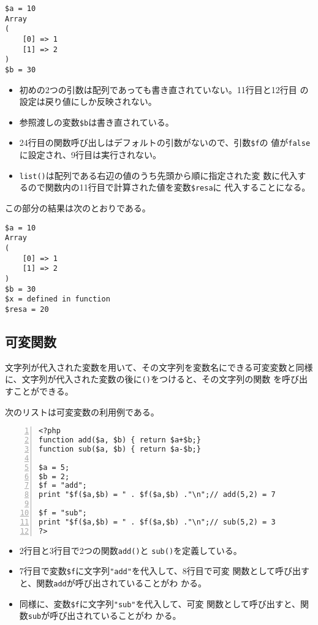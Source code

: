 \begin{Exec}
\begin{Verbatim}
$a = 10
Array
(
    [0] => 1
    [1] => 2
)
$b = 30
\end{Verbatim}
\begin{itemize}
 \item 初めの2つの引数は配列であっても書き直されていない。11行目と12行目
       の設定は戻り値にしか反映されない。
 \item 参照渡しの変数\Verb+$b+は書き直されている。
\end{itemize}
 \iffalse
 \begin{listingcont}
list($resa) = example($a, $as, $b);
print "\$resa = $resa\n";
?>
 \end{listingcont}
 \fi
 \begin{itemize}
 \item 24行目の関数呼び出しはデフォルトの引数がないので、引数\Verb+$f+の
       値が\texttt{false}に設定され、9行目は実行されない。
 \item \texttt{list()}は配列である右辺の値のうち先頭から順に指定された変
       数に代入するので関数内の11行目で計算された値を変数\Verb+$resa+に
       代入することになる。
 \end{itemize}
この部分の結果は次のとおりである。
\begin{Verbatim}
$a = 10
Array
(
    [0] => 1
    [1] => 2
)
$b = 30
$x = defined in function
$resa = 20
\end{Verbatim}
\end{Exec}
\subsection{可変関数}
文字列が代入された変数を用いて、その文字列を変数名にできる可変変数と同様
に、文字列が代入された変数の後に\texttt{()}をつけると、その文字列の関数
を呼び出すことができる。
\begin{Exec}\upshape
次のリストは可変変数の利用例である。
\begin{Verbatim}[numbers=left]
<?php
function add($a, $b) { return $a+$b;}
function sub($a, $b) { return $a-$b;}

$a = 5;
$b = 2;
$f = "add";
print "$f($a,$b) = " . $f($a,$b) ."\n";// add(5,2) = 7

$f = "sub";
print "$f($a,$b) = " . $f($a,$b) ."\n";// sub(5,2) = 3
?>
\end{Verbatim}
\begin{itemize}\upshape
 \item 2行目と3行目で2つの関数\texttt{add()}と
       \texttt{sub()}を定義している。
 \item 7行目で変数\Verb+$f+に文字列\Verb+"add"+を代入して、8行目で可変
       関数として呼び出すと、関数\texttt{add}が呼び出されていることがわ
       かる。
 \item 同様に、変数\Verb+$f+に文字列\Verb+"sub"+を代入して、可変
       関数として呼び出すと、関数\texttt{sub}が呼び出されていることがわ
       かる。
\end{itemize}
\end{Exec}
